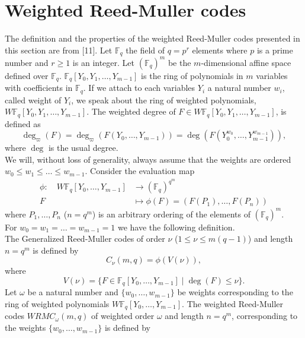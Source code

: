 \documentclass{article}
\theoremstyle{plain}
\theoremstyle{definition}
\begin{document}
\section{Weighted Reed-Muller codes}
The definition and the properties of the weighted Reed-Muller codes presented in this section are from [11].
Let $\mathbb{F}_{q}$ the field of $q=p^r$ elements where $p$ is a prime number and $r\geq 1$ is an integer.
Let $(\mathbb{F}_{q})^{m}$ be the $m$-dimensional affine space defined over $\mathbb{F}_{q}$. $\mathbb{F}_{q}[Y_{0},Y_{1},\ldots ,Y_{m-1}]$ is the ring of polynomials in $m$ variables with coefficients in $\mathbb{F}_{q}$. If we attach to each variables $Y_{i}$ a natural number $w_{i}$, called weight of $Y_{i}$, we speak about the ring of weighted polynomials, $W\mathbb{F}_{q}[Y_{0},Y_{1},\ldots ,Y_{m-1}]$. The weighted degree of $F\in W\mathbb{F}_{q}[Y_{0},Y_{1},\ldots ,Y_{m-1}]$, is defined as
\begin{equation*}
\deg_{\varpi}(F)=\deg_{\varpi}(F(Y_{0},\ldots ,Y_{m-1}))=\deg (F(Y_{0}^{w_{0}},\ldots ,Y_{m-1}^{w_{m-1}})),
\end{equation*}
where $\deg$ is the usual degree.\\
We will, without loss of generality, always assume that the weights are ordered $w_{0}\leq w_{1}\leq \ldots \leq w_{m-1}$.
Consider the evaluation map
\begin{equation}
\begin{aligned}
\phi :\quad  W\mathbb{F}_{q}[Y_{0},\ldots ,Y_{m-1}]&\longrightarrow (\mathbb{F}_{q})^{q^{m}} \\
        F &\longmapsto \phi(F)=(F(P_{1}),\ldots ,F(P_{n}))
\end{aligned}
\end{equation}
where $P_{1},\ldots ,P_{n}$ ($n=q^{m}$) is an arbitrary ordering of the elements of $(\mathbb{F}_{q})^{m}$.\\
For $w_{0}= w_{1}= \ldots = w_{m-1}=1$ we have the following definition.\\
The Generalized Reed-Muller codes of order $\nu$ ($1\leq \nu \leq m(q-1)$) and length $n=q^{m}$ is defined by
\begin{equation*}
C_{\nu}(m,q)=\phi(V(\nu)),
\end{equation*}
where
\begin{equation*}
V(\nu)=\{F\in \mathbb{F}_{q}[Y_{0},\ldots ,Y_{m-1}]\mid \deg(F)\leq\nu\}.
\end{equation*}
Let $\omega$ be a natural number and $\{w_{0},\ldots ,w_{m-1}\}$ be weights corresponding to the ring of weighted polynomials $W\mathbb{F}_{q}[Y_{0},\ldots ,Y_{m-1}]$. The weighted Reed-Muller codes $WRMC_{\omega}(m,q)$ of weighted order $\omega$ and length $n=q^{m}$, corresponding to the weights $\{w_{0},\ldots ,w_{m-1}\}$ is defined by
\end{document}
